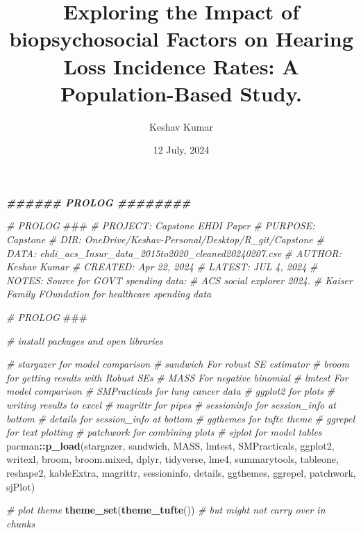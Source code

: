 \documentclass[
]{article}
\title{Exploring the Impact of biopsychosocial Factors on Hearing Loss
Incidence Rates: A Population-Based Study.}
\author{Keshav Kumar}
\date{12 July, 2024}
\newenvironment{Shaded}{\begin{snugshade}}{\end{snugshade}}
\newcommand{\AlertTok}[1]{\textcolor[rgb]{0.94,0.16,0.16}{#1}}
\newcommand{\CommentTok}[1]{\textcolor[rgb]{0.56,0.35,0.01}{\textit{#1}}}
\newcommand{\DocumentationTok}[1]{\textcolor[rgb]{0.56,0.35,0.01}{\textbf{\textit{#1}}}}
\newcommand{\FunctionTok}[1]{\textcolor[rgb]{0.13,0.29,0.53}{\textbf{#1}}}
\newcommand{\NormalTok}[1]{#1}
\newcommand{\SpecialCharTok}[1]{\textcolor[rgb]{0.81,0.36,0.00}{\textbf{#1}}}
\begin{document}
\maketitle

{
\setcounter{tocdepth}{4}
\tableofcontents
}
\begin{Shaded}
\begin{Highlighting}[]
\DocumentationTok{\#\#\#\#\#\# PROLOG \#\#\#\#\#\#\#\#}


\CommentTok{\# PROLOG   }\AlertTok{\#\#\#}
\CommentTok{\# PROJECT: Capstone EHDI Paper                                   }
\CommentTok{\# PURPOSE: Capstone                                      }
\CommentTok{\# DIR:     OneDrive/Keshav{-}Personal/Desktop/R\_git/Capstone                    }
\CommentTok{\# DATA:    ehdi\_acs\_Insur\_data\_2015to2020\_cleaned20240207.csv             }
\CommentTok{\# AUTHOR:  Keshav Kumar                                            }
\CommentTok{\# CREATED: Apr 22, 2024                                           }
\CommentTok{\# LATEST:  JUL 4, 2024                                      }
\CommentTok{\# NOTES:   Source for GOVT spending data: }
\CommentTok{\#          ACS social explorer 2024.}
\CommentTok{\#         Kaiser Family FOundation for healthcare spending data}

\CommentTok{\# PROLOG   }\AlertTok{\#\#\#}\CommentTok{ }


\CommentTok{\# install packages and open libraries}

\CommentTok{\# stargazer for model comparison}
\CommentTok{\# sandwich For robust SE estimator}
\CommentTok{\# broom for getting results with Robust SEs}
\CommentTok{\# MASS For negative binomial}
\CommentTok{\# lmtest For model comparison}
\CommentTok{\# SMPracticals for lung cancer data}
\CommentTok{\# ggplot2 for plots}
\CommentTok{\# writing results to excel}
\CommentTok{\# magrittr for pipes}
\CommentTok{\# sessioninfo for session\_info at bottom}
\CommentTok{\# details for session\_info at bottom}
\CommentTok{\# ggthemes for tufte theme}
\CommentTok{\# ggrepel for text plotting}
\CommentTok{\# patchwork for combining plots}
\CommentTok{\# sjplot for model tables}
\NormalTok{pacman}\SpecialCharTok{::}\FunctionTok{p\_load}\NormalTok{(stargazer, sandwich, MASS, lmtest, SMPracticals, ggplot2, writexl, broom, broom.mixed, dplyr, tidyverse, lme4, summarytools, tableone, reshape2, kableExtra, magrittr, sessioninfo, details, ggthemes, ggrepel, patchwork, sjPlot)}

\CommentTok{\# plot theme}
\FunctionTok{theme\_set}\NormalTok{(}\FunctionTok{theme\_tufte}\NormalTok{())  }\CommentTok{\# but might not carry over in chunks}


\end{Highlighting}
\end{Shaded}
\end{document}

